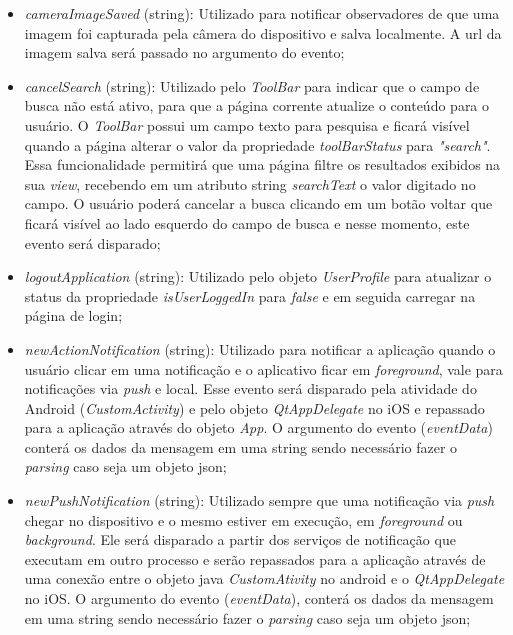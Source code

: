 \begin{itemize}
	\begin{itemize}
		\item \textit{cameraImageSaved} (string): Utilizado para notificar observadores de que uma imagem foi capturada pela câmera do dispositivo e salva localmente. A url da imagem salva será passado no argumento do evento;

		\item \textit{cancelSearch} (string): Utilizado pelo \textit{ToolBar} para indicar que o campo de busca não está ativo, para que a página corrente atualize o conteúdo para o usuário. O \textit{ToolBar} possui um campo texto para pesquisa e ficará visível quando a página alterar o valor da propriedade \textit{toolBarStatus} para \textit{"search"}. Essa funcionalidade permitirá que uma página filtre os resultados exibidos na sua \textit{view}, recebendo em um atributo string \textit{searchText} o valor digitado no campo. O usuário poderá cancelar a busca clicando em um botão voltar que ficará visível ao lado esquerdo do campo de busca e nesse momento, este evento será disparado;

		\item \textit{logoutApplication} (string): Utilizado pelo objeto \textit{UserProfile} para atualizar o status da propriedade \textit{isUserLoggedIn} para \textit{false} e em seguida carregar na página de login;

		\item \textit{newActionNotification} (string): Utilizado para notificar a aplicação quando o usuário clicar em uma notificação e o aplicativo ficar em \textit{foreground}, vale para notificações via \textit{push} e local. Esse evento será disparado pela atividade do Android (\textit{CustomActivity}) e pelo objeto \textit{QtAppDelegate} no iOS e repassado para a aplicação através do objeto \textit{App}. O argumento do evento (\textit{eventData}) conterá os dados da mensagem em uma string sendo necessário fazer o \textit{parsing} caso seja um objeto json;

		\item \textit{newPushNotification} (string): Utilizado sempre que uma notificação via \textit{push} chegar no dispositivo e o mesmo estiver em execução, em \textit{foreground} ou \textit{background}. Ele será disparado a partir dos serviços de notificação que executam em outro processo e serão repassados para a aplicação através de uma conexão entre o objeto java \textit{CustomAtivity} no android e o \textit{QtAppDelegate} no iOS. O argumento do evento (\textit{eventData}), conterá os dados da mensagem em uma string sendo necessário fazer o \textit{parsing} caso seja um objeto json;


\end{itemize}
\end{itemize}

